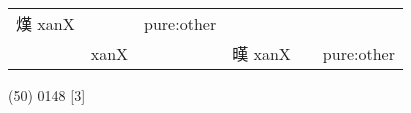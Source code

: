 \documentclass[14pt,a4paper]{scrartcl}
\begin{document}
\begin{longtable}[c]{@{}llllll@{}}
\begin{minipage}[t]{0.14\columnwidth}\raggedright\strut
熯 xanX
\strut\end{minipage} &
\begin{minipage}[t]{0.14\columnwidth}\raggedright\strut
\strut\end{minipage} &
\begin{minipage}[t]{0.14\columnwidth}\raggedright\strut
pure:other
\strut\end{minipage}\tabularnewline
\begin{minipage}[t]{0.14\columnwidth}\raggedright\strut
𡏳
\strut\end{minipage} &
\begin{minipage}[t]{0.14\columnwidth}\raggedright\strut
xanX
\strut\end{minipage} &
\begin{minipage}[t]{0.14\columnwidth}\raggedright\strut
\strut\end{minipage} &
\begin{minipage}[t]{0.14\columnwidth}\raggedright\strut
暵 xanX
\strut\end{minipage} &
\begin{minipage}[t]{0.14\columnwidth}\raggedright\strut
\strut\end{minipage} &
\begin{minipage}[t]{0.14\columnwidth}\raggedright\strut
pure:other
\strut\end{minipage}\tabularnewline
\bottomrule
\end{longtable}

(50) 0148 {[}3{]}
\end{document}
